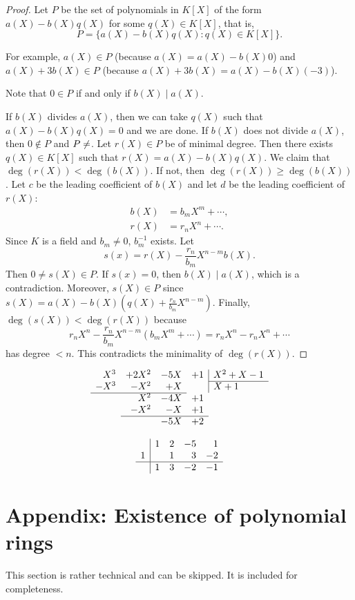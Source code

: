 \documentclass[12pt]{amsproc}
\begin{document}
\begin{proof}
    Let $P$ be the set of polynomials in $K[X]$ of the 
    form $a(X)-b(X)q(X)$ for some $q(X)\in K[X]$, that is,
    \[
    P=\{ a(X)-b(X)q(X) : q(X)\in K[X] \}.
    \]
    
    For example, 
    $a(X)\in P$ (because $a(X)=a(X)-b(X)0$) and 
    $a(X)+3b(X)\in P$ (because $a(X)+3b(X)=a(X)-b(X)(-3)$).
    
    Note that $0\in P$ if and only if $b(X)\mid a(X)$. 
    
    If $b(X)$ divides $a(X)$, then we can take $q(X)$ such that $a(X)-b(X)q(X)=0$ and we are done.
    If $b(X)$ does not divide $a(X)$, then $0\notin P$ and $P\ne\empty$. 
    Let $r(X)\in P$ be of minimal degree. Then there exists $q(X)\in K[X]$ such that $r(X)=a(X)-b(X)q(X)$. We claim that $\deg(r(X))<\deg(b(X))$. If not, then $\deg(r(X))\ge \deg(b(X))$. Let $c$ be the leading coefficient of $b(X)$ and let $d$ be the leading coefficient of $r(X)$:
    \begin{align*}
        b(X) &= b_mX^m+\cdots,\\
        r(X) &= r_nX^n+\cdots.
    \end{align*} 
    Since $K$ is a field and $b_m\ne 0$, $b_m^{-1}$ exists. Let  
    \[ 
    s(x)=r(X)-\frac{r_n}{b_m}X^{n-m}b(X).
    \]
    Then $0\ne s(X)\in P$. If $s(x)=0$, then $b(X)\mid a(X)$, which is a 
    contradiction. Moreover, $s(X)\in P$ since $s(X)=a(X)-b(X)(q(X)+\frac{r_n}{b_m}X^{n-m})$. Finally, $\deg(s(X))<\deg(r(X))$ because 
\[
r_nX^n-\frac{r_n}{b_m}X^{n-m}(b_mX^m+\cdots)=r_nX^n-r_nX^n+\cdots 
\]
has degree $<n$. 
This contradicts the minimality of $\deg(r(X))$. 
\end{proof}

\[
\begin{array}{rrrr|l}
 X^3  & +2X^2 & -5X & +1 & X^2+X-1 \\ \cline{5-5}
 -X^3 & -X^2  & +X  &    & X+1 \\ \cline{1-3}
      & X^2   & -4X & \multicolumn{1}{r}{+1} & \\
      & -X^2  & -X  & \multicolumn{1}{r}{+1} & \\ \cline{2-4}
      &       & -5X & \multicolumn{1}{r}{+2} &
\end{array}
\]

\[
\begin{array}{c|rrrr}
   & 1 & 2 & -5 & 1 \\
 1 &   & 1 &  3 & -2 \\ \hline
   & 1 & 3 & -2 & -1
\end{array}
\]

\section{Appendix: Existence of polynomial rings}

This section is rather technical and can be skipped. It is included for completeness.



\end{document}

